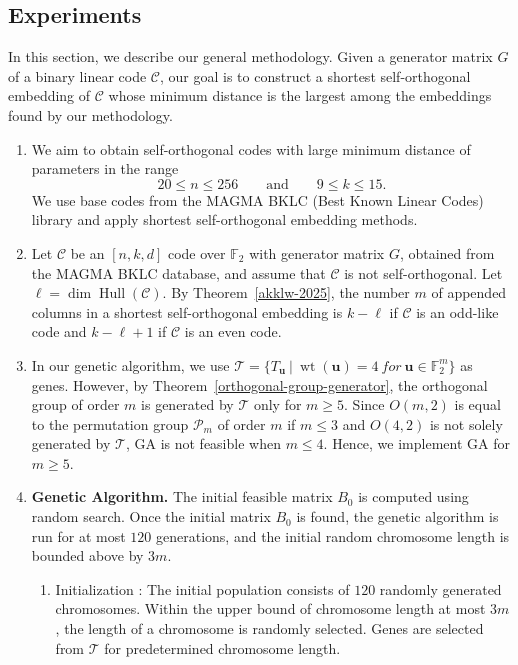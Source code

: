 \documentclass{article}
\newcommand{\wt}{\operatorname{wt}}
\newcommand{\Hull}{\operatorname{Hull}}
\begin{document}
\subsection{Experiments}
In this section, we describe our general methodology. Given a generator matrix $G$ of a binary linear code $\mathcal{C}$, our goal is to construct a shortest self-orthogonal embedding of $\mathcal{C}$ whose minimum distance is the largest among the embeddings found by our methodology.
\begin{enumerate}
    \item We aim to obtain self-orthogonal codes with large minimum distance of parameters in the range
    \[
    20\leq n\leq 256
    \qquad\text{and}\qquad
    9\leq k\leq 15.
    \]
    We use base codes from the MAGMA BKLC (Best Known Linear Codes) library and apply shortest self-orthogonal embedding methods.
    \item Let $\mathcal{C}$ be an $[n,k,d]$ code over $\mathbb{F}_2$ with generator matrix $G$, obtained from the MAGMA BKLC database, and assume that $\mathcal{C}$ is not self-orthogonal. Let $\ell=\dim\Hull(\mathcal{C})$. By Theorem~\ref{akklw-2025}, the number $m$ of appended columns in a shortest self-orthogonal embedding is $k-\ell$ if $\mathcal{C}$ is an odd-like code and $k-\ell+1$ if $\mathcal{C}$ is an even code.
    \item In our genetic algorithm, we use $\mathcal{T} = \{T_\mathbf{u}~|~\wt(\mathbf{u})=4~for~\mathbf{u}\in\mathbb{F}_2^m\}$ as genes. However, by Theorem~\ref{orthogonal-group-generator}, the orthogonal group of order $m$ is generated by $\mathcal{T}$ only for $m \geq 5$. Since $O(m,2)$ is equal to the permutation group $\mathcal{P}_m$ of order $m$ if $m\leq3$ and $O(4,2)$ is not solely generated by $\mathcal{T}$, GA is not feasible when $m \leq 4$. Hence, we implement GA for $m \geq 5$.
    \item \textbf{Genetic Algorithm. }The initial feasible matrix $B_0$ is computed using random search. Once the initial matrix $B_0$ is found, the genetic algorithm is run for at most $120$ generations, and the initial random chromosome length is bounded above by $3m$.
    \begin{enumerate}
        \item Initialization : The initial population consists of $120$ randomly generated chromosomes. Within the upper bound of chromosome length at most $3m$, the length of a chromosome is randomly selected. Genes are selected from $\mathcal{T}$ for predetermined chromosome length.


\end{enumerate}
\end{enumerate}
\end{document}

